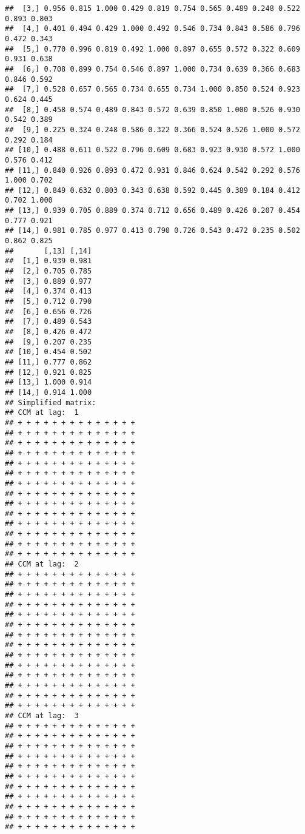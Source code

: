 \documentclass[
]{article}
\begin{document}
\begin{verbatim}
##  [3,] 0.956 0.815 1.000 0.429 0.819 0.754 0.565 0.489 0.248 0.522 0.893 0.803
##  [4,] 0.401 0.494 0.429 1.000 0.492 0.546 0.734 0.843 0.586 0.796 0.472 0.343
##  [5,] 0.770 0.996 0.819 0.492 1.000 0.897 0.655 0.572 0.322 0.609 0.931 0.638
##  [6,] 0.708 0.899 0.754 0.546 0.897 1.000 0.734 0.639 0.366 0.683 0.846 0.592
##  [7,] 0.528 0.657 0.565 0.734 0.655 0.734 1.000 0.850 0.524 0.923 0.624 0.445
##  [8,] 0.458 0.574 0.489 0.843 0.572 0.639 0.850 1.000 0.526 0.930 0.542 0.389
##  [9,] 0.225 0.324 0.248 0.586 0.322 0.366 0.524 0.526 1.000 0.572 0.292 0.184
## [10,] 0.488 0.611 0.522 0.796 0.609 0.683 0.923 0.930 0.572 1.000 0.576 0.412
## [11,] 0.840 0.926 0.893 0.472 0.931 0.846 0.624 0.542 0.292 0.576 1.000 0.702
## [12,] 0.849 0.632 0.803 0.343 0.638 0.592 0.445 0.389 0.184 0.412 0.702 1.000
## [13,] 0.939 0.705 0.889 0.374 0.712 0.656 0.489 0.426 0.207 0.454 0.777 0.921
## [14,] 0.981 0.785 0.977 0.413 0.790 0.726 0.543 0.472 0.235 0.502 0.862 0.825
##       [,13] [,14]
##  [1,] 0.939 0.981
##  [2,] 0.705 0.785
##  [3,] 0.889 0.977
##  [4,] 0.374 0.413
##  [5,] 0.712 0.790
##  [6,] 0.656 0.726
##  [7,] 0.489 0.543
##  [8,] 0.426 0.472
##  [9,] 0.207 0.235
## [10,] 0.454 0.502
## [11,] 0.777 0.862
## [12,] 0.921 0.825
## [13,] 1.000 0.914
## [14,] 0.914 1.000
## Simplified matrix: 
## CCM at lag:  1 
## + + + + + + + + + + + + + + 
## + + + + + + + + + + + + + + 
## + + + + + + + + + + + + + + 
## + + + + + + + + + + + + + + 
## + + + + + + + + + + + + + + 
## + + + + + + + + + + + + + + 
## + + + + + + + + + + + + + + 
## + + + + + + + + + + + + + + 
## + + + + + + + + + + + + + + 
## + + + + + + + + + + + + + + 
## + + + + + + + + + + + + + + 
## + + + + + + + + + + + + + + 
## + + + + + + + + + + + + + + 
## + + + + + + + + + + + + + + 
## CCM at lag:  2 
## + + + + + + + + + + + + + + 
## + + + + + + + + + + + + + + 
## + + + + + + + + + + + + + + 
## + + + + + + + + + + + + + + 
## + + + + + + + + + + + + + + 
## + + + + + + + + + + + + + + 
## + + + + + + + + + + + + + + 
## + + + + + + + + + + + + + + 
## + + + + + + + + + + + + + + 
## + + + + + + + + + + + + + + 
## + + + + + + + + + + + + + + 
## + + + + + + + + + + + + + + 
## + + + + + + + + + + + + + + 
## + + + + + + + + + + + + + + 
## CCM at lag:  3 
## + + + + + + + + + + + + + + 
## + + + + + + + + + + + + + + 
## + + + + + + + + + + + + + + 
## + + + + + + + + + + + + + + 
## + + + + + + + + + + + + + + 
## + + + + + + + + + + + + + + 
## + + + + + + + + + + + + + + 
## + + + + + + + + + + + + + + 
## + + + + + + + + + + + + + + 
## + + + + + + + + + + + + + + 
## + + + + + + + + + + + + + + 

\end{verbatim}
\end{document}
